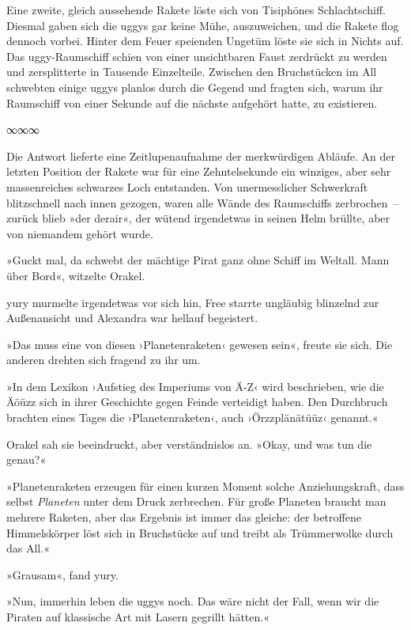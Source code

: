 Eine zweite, gleich aussehende Rakete löste sich von Tisiphönes Schlachtschiff. Diesmal gaben sich die uggys gar keine Mühe, auszuweichen, und die Rakete flog dennoch vorbei. Hinter dem Feuer speienden Ungetüm löste sie sich in Nichts auf. Das uggy-Raumschiff schien von einer unsichtbaren Faust zerdrückt zu werden und zersplitterte in Tausende Einzelteile. Zwischen den Bruchstücken im All schwebten einige uggys planlos durch die Gegend und fragten sich, warum ihr Raumschiff von einer Sekunde auf die nächste aufgehört hatte, zu existieren.

\begin{center}
    ∞∞∞
\end{center}

Die Antwort lieferte eine Zeitlupenaufnahme der merkwürdigen Abläufe. An der letzten Position der Rakete war für eine Zehntelsekunde ein winziges, aber sehr massenreiches schwarzes Loch entstanden. Von unermesslicher Schwerkraft blitzschnell nach innen gezogen, waren alle Wände des Raumschiffs zerbrochen~– zurück blieb »der derair«, der wütend irgendetwas in seinen Helm brüllte, aber von niemandem gehört wurde.

»Guckt mal, da schwebt der mächtige Pirat ganz ohne Schiff im Weltall. Mann über Bord«, witzelte Orakel.

yury murmelte irgendetwas vor sich hin, Free starrte ungläubig blinzelnd zur Außenansicht und Alexandra war hellauf begeistert.

»Das muss eine von diesen ›Planetenraketen‹ gewesen sein«, freute sie sich. Die anderen drehten sich fragend zu ihr um.

»In dem Lexikon ›Aufstieg des Imperiums von Ä-Z‹ wird beschrieben, wie die Äöüzz sich in ihrer Geschichte gegen Feinde verteidigt haben. Den Durchbruch brachten eines Tages die ›Planetenraketen‹, auch ›Örzzplänätüüz‹ genannt.«

Orakel sah sie beeindruckt, aber verständnislos an. »Okay, und was tun die genau?«

»Planetenraketen erzeugen für einen kurzen Moment solche Anziehungskraft, dass selbst \textit{Planeten} unter dem Druck zerbrechen. Für große Planeten braucht man mehrere Raketen, aber das Ergebnis ist immer das gleiche: der betroffene Himmelskörper löst sich in Bruchstücke auf und treibt als Trümmerwolke durch das All.«

»Grausam«, fand yury.

»Nun, immerhin leben die uggys noch. Das wäre nicht der Fall, wenn wir die Piraten auf klassische Art mit Lasern gegrillt hätten.«

